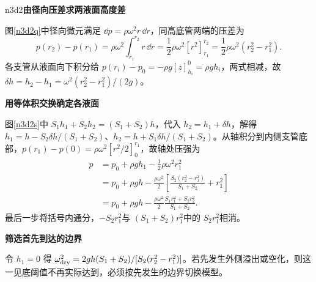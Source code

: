 \begin{drillsolution}{n3d2}\textbf{由径向压差求两液面高度差}\par\nobreak
图\ref{n3d2q}中径向微元满足 $\dd p=\rho\omega^2r\,\dd r$，同高底管两端的压差为
\[
p(r_2)-p(r_1)=\rho\omega^2\int_{r_1}^{r_2}r\,\dd r
=\frac12\rho\omega^2[r^2]_{r_1}^{r_2}
=\frac12\rho\omega^2(r_2^2-r_1^2).
\]
各支管从液面向下积分给 $p(r_i)-p_0=-\rho g[z]_{h_i}^0=\rho gh_i$，两式相减，故 $\delta h=h_2-h_1=\omega^2(r_2^2-r_1^2)/(2g)$。


\par\medskip{}\noindent\textbf{用等体积交换确定各液面}\par\nobreak
图\ref{n3d2s}中 $S_1h_1+S_2h_2=(S_1+S_2)h$，代入 $h_2=h_1+\delta h$，解得 $h_1=h-S_2\delta h/(S_1+S_2)$、$h_2=h+S_1\delta h/(S_1+S_2)$。从轴积分到内侧支管底部，$p(r_1)-p(0)=\rho\omega^2[r^2/2]_0^{r_1}$，故轴处压强为
\begin{align*}
 p&=p_0+\rho gh_1-\tfrac12\rho\omega^2r_1^2\\
 &=p_0+\rho gh-\frac{\rho\omega^2}{2}
 \left[\frac{S_2(r_2^2-r_1^2)}{S_1+S_2}+r_1^2\right]\\
 &=p_0+\rho gh-\frac{\rho\omega^2}{2}
 \frac{S_1r_1^2+S_2r_2^2}{S_1+S_2}.
\end{align*}
最后一步将括号内通分，$-S_2r_1^2$与 $(S_1+S_2)r_1^2$中的 $S_2r_1^2$相消。


\par\medskip{}\noindent\textbf{筛选首先到达的边界}\par\nobreak
令 $h_1=0$ 得 $\omega_{\rm dry}^2=2gh(S_1+S_2)/[S_2(r_2^2-r_1^2)]$。若先发生外侧溢出或空化，则这一见底阈值不再实际达到，必须按先发生的边界切换模型。
\end{drillsolution}

